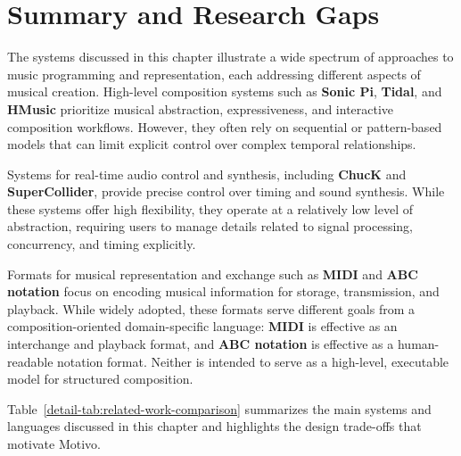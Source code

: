 
\section{Summary and Research Gaps}\label{detail-sec:summary-and-research-gaps}

The systems discussed in this chapter illustrate a wide spectrum of approaches to music programming and representation,
each addressing different aspects of musical creation.
High-level composition systems such as \textbf{Sonic Pi}, \textbf{Tidal}, and \textbf{HMusic} prioritize musical
abstraction, expressiveness, and interactive composition workflows.
However, they often rely on sequential or pattern-based models that can limit explicit control over complex temporal
relationships.

Systems for real-time audio control and synthesis, including \textbf{ChucK} and \textbf{SuperCollider}, provide precise
control over timing and sound synthesis.
While these systems offer high flexibility, they operate at a relatively low level of abstraction, requiring users to
manage details related to signal processing, concurrency, and timing explicitly.

Formats for musical representation and exchange such as \textbf{MIDI} and \textbf{ABC notation} focus on encoding
musical information for storage, transmission, and playback\@.
While widely adopted, these formats serve different goals from a composition-oriented domain-specific
language\@: \textbf{MIDI} is effective
as an interchange and playback format, and \textbf{ABC notation} is effective as a human-readable notation format.
Neither is intended to serve as a high-level, executable model for structured composition.

Table~\ref{detail-tab:related-work-comparison} summarizes the main systems and languages discussed in this chapter and
highlights the design trade-offs that motivate Motivo\@.

